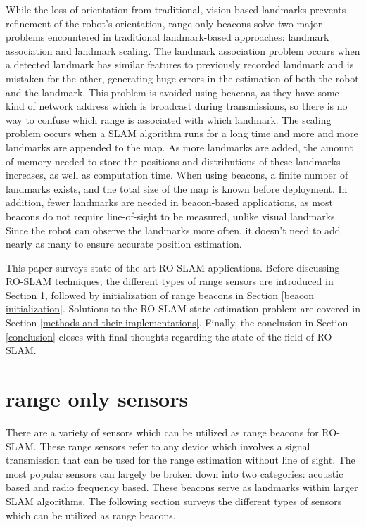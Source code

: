 \documentclass[conference]{IEEEtran}
\begin{document}
		While the loss of orientation from traditional, vision based landmarks prevents refinement of the robot's orientation, range only beacons solve two major problems encountered in traditional landmark-based approaches: landmark association and landmark scaling. The landmark association problem occurs when a detected landmark has similar features to previously recorded landmark and is mistaken for the other, generating huge errors in the estimation of both the robot and the landmark. This problem is avoided using beacons, as they have some kind of network address which is broadcast during transmissions, so there is no way to confuse which range is associated with which landmark. The scaling problem occurs when a SLAM algorithm runs for a long time and more and more landmarks are appended to the map. As more landmarks are added, the amount of memory needed to store the positions and distributions of these landmarks increases, as well as computation time. When using beacons, a finite number of landmarks exists, and the total size of the map is known before deployment. In addition, fewer landmarks are needed in beacon-based applications, as most beacons do not require line-of-sight to be measured, unlike visual landmarks. Since the robot can observe the landmarks more often, it doesn't need to add nearly as many to ensure accurate position estimation.
		
		This paper surveys state of the art RO-SLAM applications. Before discussing RO-SLAM techniques, the different types of range sensors are introduced in Section \ref{range only sensors}, followed by initialization of range beacons in Section \ref{beacon initialization}. Solutions to the RO-SLAM state estimation problem are covered in Section \ref{methods and their implementations}. Finally, the conclusion in Section \ref{conclusion} closes with final thoughts regarding the state of the field of RO-SLAM.
	
	
	\section{range only sensors}
	\label{range only sensors}
		There are a variety of sensors which can be utilized as range beacons for RO-SLAM. These range sensors refer to any device which involves a signal transmission that can be used for the range estimation without line of sight. The most popular sensors can largely be broken down into two categories: acoustic based and radio frequency based. These beacons serve as landmarks within larger SLAM algorithms. The following section surveys the different types of sensors which can be utilized as range beacons.
	
\end{document}

